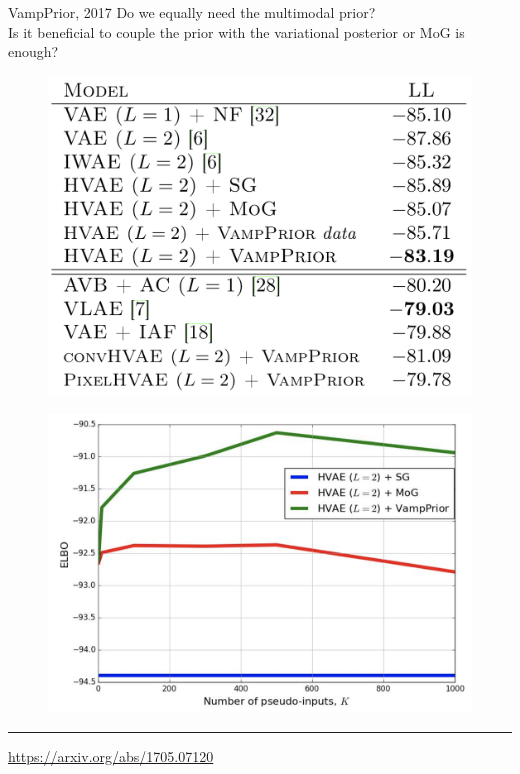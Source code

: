 \begin{frame}{VampPrior, 2017}
	Do we equally need the multimodal prior? \\
	\vspace{0.2cm}
	Is it beneficial to couple the prior with the variational posterior or MoG is enough?
	\begin{minipage}[t]{0.5\columnwidth}
		\begin{figure}[h]
			\centering
			\includegraphics[width=1.\linewidth]{figs/VampPrior_1.png}
		\end{figure}
	\end{minipage}%
	\begin{minipage}[t]{0.5\columnwidth}
		\begin{figure}[h]
			\centering
			\includegraphics[width=1.\linewidth]{figs/VampPrior_2.png}
		\end{figure}
	\end{minipage}
	\vfill
	\hrule\medskip
	{\scriptsize \href{https://arxiv.org/abs/1705.07120}{https://arxiv.org/abs/1705.07120}}
\end{frame}

